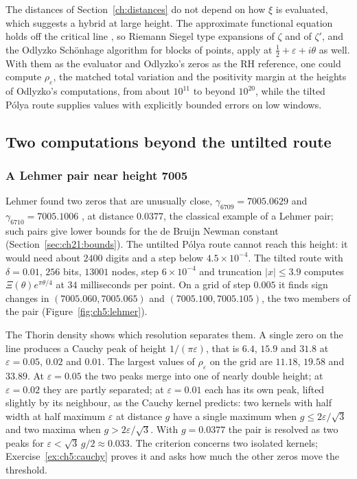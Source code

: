 \label{sec:ch5:hybrid}The distances of Section~\ref{ch:distances} do not depend on how $\xi$ is evaluated, which suggests a hybrid at large height. The approximate functional equation holds off the critical line \cite[Chapter 4]{Titchmarsh}, so Riemann Siegel type expansions of $\zeta$ \cite[Theorems 3.1 and 4.2]{AriasDeReyna11} and of $\zeta'$, and the Odlyzko Sch\"onhage algorithm for blocks of points, apply at $\tfrac12+\varepsilon+i\theta$ as well. With them as the evaluator and Odlyzko's zeros \cite{OdlyzkoTables} as the RH reference, one could compute $\rho_\varepsilon$, the matched total variation and the positivity margin at the heights of Odlyzko's computations, from about $10^{11}$ to beyond $10^{20}$, while the tilted P\'olya route supplies values with explicitly bounded errors on low windows.

\subsection{Two computations beyond the untilted route}

\subsubsection{A Lehmer pair near height 7005}\label{sec:ch5:lehmer}

Lehmer found two zeros that are unusually close, $\gamma_{6709}=7005.0629$ and $\gamma_{6710}=7005.1006$ \cite[pp.~297 and 298]{Lehmer56}, at distance $0.0377$, the classical example of a Lehmer pair; such pairs give lower bounds for the de Bruijn Newman constant \cite{CSV94} (Section~\ref{sec:ch21:bounds}). The untilted P\'olya route cannot reach this height: it would need about $2400$ digits and a step below $4.5\times10^{-4}$. The tilted route with $\delta=0.01$, $256$ bits, $13001$ nodes, step $6\times10^{-4}$ and truncation $|x|\le3.9$ computes $\Xi(\theta)e^{\pi\theta/4}$ at $34$ milliseconds per point. On a grid of step $0.005$ it finds sign changes in $(7005.060,7005.065)$ and $(7005.100,7005.105)$, the two members of the pair (Figure~\ref{fig:ch5:lehmer}).

The Thorin density shows which resolution separates them. A single zero on the line produces a Cauchy peak of height $1/(\pi\varepsilon)$, that is $6.4$, $15.9$ and $31.8$ at $\varepsilon=0.05$, $0.02$ and $0.01$. The largest values of $\rho_\varepsilon$ on the grid are $11.18$, $19.58$ and $33.89$. At $\varepsilon=0.05$ the two peaks merge into one of nearly double height; at $\varepsilon=0.02$ they are partly separated; at $\varepsilon=0.01$ each has its own peak, lifted slightly by its neighbour, as the Cauchy kernel predicts: two kernels with half width at half maximum $\varepsilon$ at distance $g$ have a single maximum when $g\le2\varepsilon/\sqrt3$ and two maxima when $g>2\varepsilon/\sqrt3$. With $g=0.0377$ the pair is resolved as two peaks for $\varepsilon<\sqrt3\,g/2\approx0.033$. The criterion concerns two isolated kernels; Exercise~\ref{ex:ch5:cauchy} proves it and asks how much the other zeros move the threshold.

